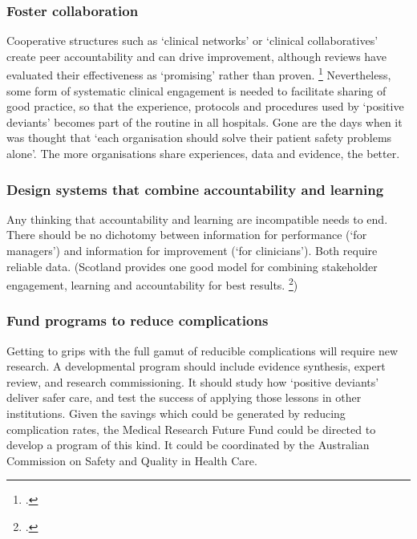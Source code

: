 \documentclass[FrontPage]{grattan}
\begin{document}
\subsubsection{Foster collaboration}
Cooperative structures such as `clinical networks' or `clinical collaboratives'
create peer accountability and can drive improvement,
although reviews have evaluated their effectiveness as `promising' rather than proven.%
	\footcites{scott2009measurement}{Nelson-2007-Quality-by-design}
Nevertheless, some form of systematic clinical engagement is needed to facilitate sharing of good practice, so that the experience, protocols and procedures used by `positive deviants' becomes part of the routine in all hospitals.
Gone are the days when it was thought that `each organisation should solve their patient safety problems alone'. The more organisations share experiences, data and evidence, the better.

\subsubsection{Design systems that combine accountability and learning}

Any thinking that accountability and learning are incompatible needs to end. 
There should be no dichotomy between information for performance (`for managers') and information for improvement (`for clinicians'). Both require reliable data. (Scotland provides one good model for combining stakeholder engagement, learning and accountability for best results.%
	\footcites{damschroder2014effects}{schang2017complementary})

\subsubsection{Fund programs to reduce complications}
Getting to grips with the full gamut of reducible complications will require new research.
A developmental program should include evidence synthesis, expert review, and research commissioning.
It should study how `positive deviants' deliver safer care, and test the success of applying those lessons in other institutions.
Given the savings which could be generated by reducing complication rates, the Medical Research Future Fund could be directed to develop a program of this kind.
It could be coordinated by the Australian Commission on Safety and Quality in Health Care.
\end{document}
